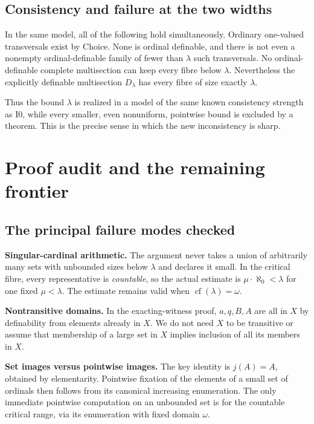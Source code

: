 \documentclass[11pt,letterpaper]{article}
\theoremstyle{definition}
\numberwithin{equation}{section}
\newcommand{\cf}{\operatorname{cf}}
\newcommand{\Izero}{\mathrm{I0}}
\begin{document}
\subsection{Consistency and failure at the two widths}

In the same model, all of the following hold simultaneously. Ordinary one-valued transversals exist by Choice. None is ordinal definable, and there is not even a nonempty ordinal-definable family of fewer than $\lambda$ such transversals. No ordinal-definable complete multisection can keep every fibre below $\lambda$. Nevertheless the explicitly definable multisection $D_\lambda$ has every fibre of size exactly $\lambda$.

Thus the bound $\lambda$ is realized in a model of the same known consistency strength as $\Izero$, while every smaller, even nonuniform, pointwise bound is excluded by a theorem. This is the precise sense in which the new inconsistency is sharp.

\section{Proof audit and the remaining frontier}\label{sec:audit}

\subsection{The principal failure modes checked}

\textbf{Singular-cardinal arithmetic.}
The argument never takes a union of arbitrarily many sets with unbounded sizes below $\lambda$ and declares it small. In the critical fibre, every representative is \emph{countable}, so the actual estimate is $\mu\cdot\aleph_0<\lambda$ for one fixed $\mu<\lambda$. The estimate remains valid when $\cf(\lambda)=\omega$.

\textbf{Nontransitive domains.}
In the exacting-witness proof, $a,q,B,A$ are all in $X$ by definability from elements already in $X$. We do not need $X$ to be transitive or assume that membership of a large set in $X$ implies inclusion of all its members in $X$.

\textbf{Set images versus pointwise images.}
The key identity is $j(A)=A$, obtained by elementarity. Pointwise fixation of the elements of a small set of ordinals then follows from its canonical increasing enumeration. The only immediate pointwise computation on an unbounded set is for the countable critical range, via its enumeration with fixed domain $\omega$.
\end{document}
